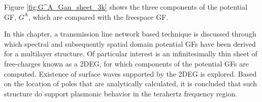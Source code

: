 \documentclass[12pt]{article}
\begin{document}
Figure \ref{fig:G^A_Gan_sheet_3k} shows the three components of the potential GF, $G^{\mathrm A}$, which are compared with the freespace GF.






In this chapter, a transmission line network based technique is discussed through which spectral and subsequently spatial domain potential GFs have been derived for a multilayer structure. Of particular interest is an infinitesimally thin sheet of free-charges known as a 2DEG, for which components of the potential GFs are computed. Existence of surface waves supported by the 2DEG is explored. Based on the location of poles that are analytically calculated, it is concluded that such structure do support plasmonic behavior in the terahertz frequency region.

\clearpage %
% 


\end{document}
